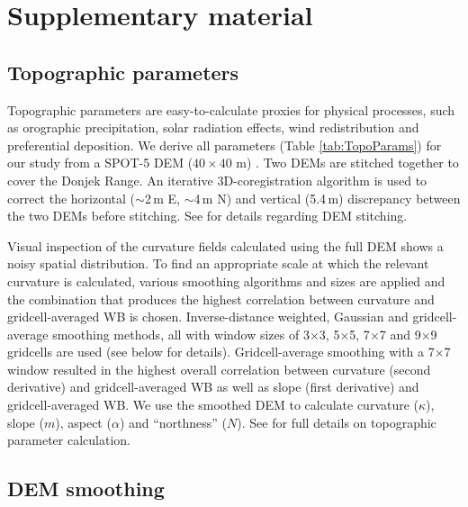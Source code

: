 \documentclass[onecolumn, letterpaper]{igs}
\begin{document}
\section*{Supplementary material}

\subsection*{Topographic parameters}


Topographic parameters are easy-to-calculate proxies for physical processes, such as orographic precipitation, solar radiation effects, wind redistribution and preferential deposition. We derive all parameters (Table \ref{tab:TopoParams}) for our study from a SPOT-5 DEM ($40\times40$ m) \citep{Korona2009}. Two DEMs are stitched together to cover the Donjek Range. An iterative 3D-coregistration algorithm \citep{Berthier2007} is used to correct the horizontal ($\sim$2\,m E, $\sim$4\,m N) and vertical (5.4\,m) discrepancy between the two DEMs before stitching. See \cite{Pulwicki2017} for details regarding DEM stitching.

Visual inspection of the curvature fields calculated using the full DEM shows a noisy spatial distribution. To find an appropriate scale at which the relevant curvature is calculated, various smoothing algorithms and sizes are applied and the combination that produces the highest correlation between curvature and gridcell-averaged WB is chosen. Inverse-distance weighted, Gaussian and gridcell-average smoothing methods, all with window sizes of 3$\times$3, 5$\times$5, 7$\times$7 and 9$\times$9 gridcells are used (see below for details). Gridcell-average smoothing with a 7$\times$7 window resulted in the highest overall correlation between curvature (second derivative) and gridcell-averaged WB as well as slope (first derivative) and gridcell-averaged WB. We use the smoothed DEM to calculate curvature ($\kappa$), slope ($m$), aspect ($\alpha$) and ``northness'' ($N$). See \cite{Pulwicki2017} for full details on topographic parameter calculation.

\subsection*{DEM smoothing}
\end{document}
